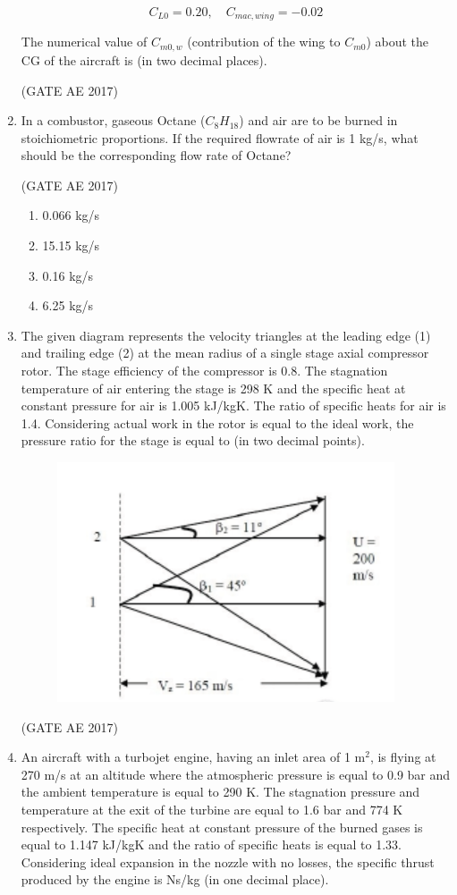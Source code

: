 \documentclass[journal,12pt,onecolumn]{IEEEtran}
\theoremstyle{remark}
\begin{document}
\begin{flushleft}
\begin{enumerate}
\[
C_{L0} = 0.20, \quad C_{mac,wing} = -0.02
\]

The numerical value of $C_{m0,w}$ (contribution of the wing to $C_{m0}$) about the CG of the aircraft is \underline{\hspace{2cm}} (in two decimal places).  

\hfill (GATE AE 2017)  

\item In a combustor, gaseous Octane ($C_8H_{18}$) and air are to be burned in stoichiometric proportions. If the required flowrate of air is 1 kg/s, what should be the corresponding flow rate of Octane?  

\hfill (GATE AE 2017)  

\begin{enumerate}
\item 0.066 kg/s  
\item 15.15 kg/s  
\item 0.16 kg/s  
\item 6.25 kg/s  
\end{enumerate}
\item The given diagram represents the velocity triangles at the leading edge (1) and trailing edge (2) at the mean radius of a single stage axial compressor rotor. The stage efficiency of the compressor is 0.8. The stagnation temperature of air entering the stage is 298 K and the specific heat at constant pressure for air is 1.005 kJ/kgK. The ratio of specific heats for air is 1.4. Considering actual work in the rotor is equal to the ideal work, the pressure ratio for the stage is equal to \underline{\hspace{2cm}} (in two decimal points).  
\begin{figure}[H]
    \centering
    \includegraphics[width=0.5\columnwidth]{figs/46.png}
    \caption{}
    \label{fig:placeholder}
\end{figure}

\hfill (GATE AE 2017)  

\item An aircraft with a turbojet engine, having an inlet area of 1 m$^2$, is flying at 270 m/s at an altitude where the atmospheric pressure is equal to 0.9 bar and the ambient temperature is equal to 290 K. The stagnation pressure and temperature at the exit of the turbine are equal to 1.6 bar and 774 K respectively. The specific heat at constant pressure of the burned gases is equal to 1.147 kJ/kgK and the ratio of specific heats is equal to 1.33. Considering ideal expansion in the nozzle with no losses, the specific thrust produced by the engine is \underline{\hspace{2cm}} Ns/kg (in one decimal place).  


\end{enumerate}
\end{flushleft}
\end{document}
